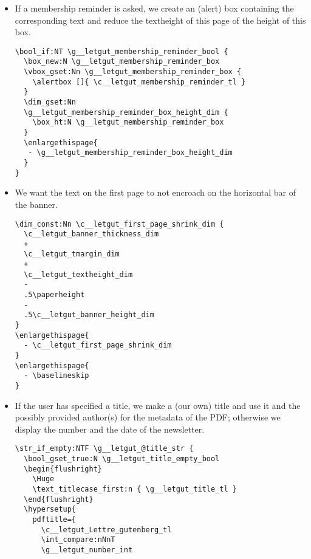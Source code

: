 \documentclass{letgut}
\begin{document}
\begin{itemize}
\item If a membership reminder is asked, we create an (alert) box containing the
corresponding text and reduce the textheight of this page of the height of
this box.
\begin{lstlisting}
\bool_if:NT \g__letgut_membership_reminder_bool {
  \box_new:N \g__letgut_membership_reminder_box
  \vbox_gset:Nn \g__letgut_membership_reminder_box {
    \alertbox []{ \c__letgut_membership_reminder_tl }
  }
  \dim_gset:Nn
  \g__letgut_membership_reminder_box_height_dim {
    \box_ht:N \g__letgut_membership_reminder_box
  }
  \enlargethispage{
   - \g__letgut_membership_reminder_box_height_dim
  }
}
\end{lstlisting}
\item We want the text on the first page to not encroach on the horizontal bar of
the banner.
\begin{lstlisting}
\dim_const:Nn \c__letgut_first_page_shrink_dim {
  \c__letgut_banner_thickness_dim
  +
  \c__letgut_tmargin_dim
  +
  \c__letgut_textheight_dim
  -
  .5\paperheight
  -
  .5\c__letgut_banner_height_dim
}
\enlargethispage{
  - \c__letgut_first_page_shrink_dim
}
\enlargethispage{
  - \baselineskip
}
\end{lstlisting}
\item If the user has specified a title, we make a (our own) title and use it and
the possibly provided author(s) for the metadata of the PDF; otherwise we
display the number and the date of the newsletter.
\begin{lstlisting}
\str_if_empty:NTF \g__letgut_@title_str {
  \bool_gset_true:N \g__letgut_title_empty_bool
  \begin{flushright}
    \Huge
    \text_titlecase_first:n { \g__letgut_title_tl }
  \end{flushright}
  \hypersetup{
    pdftitle={
      \c__letgut_Lettre_gutenberg_tl
      \int_compare:nNnT
      \g__letgut_number_int
\end{lstlisting}
\end{itemize}
\end{document}
